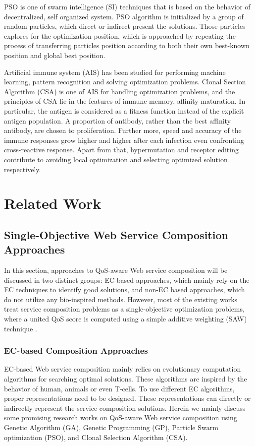 PSO is one of swarm intelligence (SI) techniques that is based on the behavior of decentralized, self organized system. PSO algorithm is initialized by a group of random particles, which direct or indirect present the solutions. Those particles explores for the optimization position, which is approached by repeating the process of transferring particles position according to both their own best-known position and global best position.

Artificial immune system (AIS) has been studied for performing machine learning, pattern recognition and solving optimization problems. Clonal Section Algorithm (CSA) is one of AIS for handling optimization problems, and the principles of CSA lie in the features of immune memory, affinity maturation. In particular, the antigen is considered as a fitness function instead of the explicit antigen population. A proportion of antibody, rather than the best affinity antibody, are chosen to proliferation. Further more, speed and accuracy of the immune responses grow higher and higher after each infection even confronting cross-reactive response. Apart from that, hypermutation and receptor editing contribute to avoiding local optimization and selecting optimized solution respectively. 


\section{Related Work}\label{related}

\subsection{Single-Objective Web Service Composition Approaches}\label{singleobjective}

In this section, approaches to QoS-aware Web service composition will be discussed in two distinct groups: EC-based approaches, which mainly rely on the EC techniques to identify good solutions, and non-EC based approaches, which do not utilize any bio-inspired methods. However, most of the existing works treat service composition problems as a single-objective optimization problems, where a united QoS score is computed using a simple additive weighting (SAW) technique \cite{hwang1981lecture}.
\subsubsection{EC-based Composition Approaches}
EC-based Web service composition mainly relies on evolutionary computation algorithms for searching optimal solutions. These algorithms are inspired by the behavior of human, animals or even T-cells. To use different EC algorithms, proper representations need to be designed. These representations can directly or indirectly represent the service composition solutions. Herein we mainly discuss some promising research works on QoS-aware Web service composition using  Genetic Algorithm (GA), Genetic Programming (GP), Particle Swarm optimization (PSO), and Clonal Selection Algorithm (CSA).

